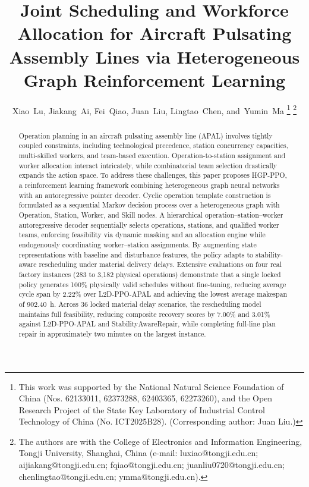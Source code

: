 \documentclass[journal,10pt]{IEEEtran}
\begin{document}
\title{Joint Scheduling and Workforce Allocation for Aircraft Pulsating Assembly Lines via Heterogeneous Graph Reinforcement Learning}

\author{Xiao~Lu,
        Jiakang~Ai,
        Fei~Qiao,
        Juan~Liu,
        Lingtao~Chen,
        and~Yumin~Ma%
\thanks{This work was supported by the National Natural Science Foundation of China (Nos. 62133011, 62373288, 62403365, 62273260), and the Open Research Project of the State Key Laboratory of Industrial Control Technology of China (No. ICT2025B28). (Corresponding author: Juan Liu.)}%
\thanks{The authors are with the College of Electronics and Information Engineering, Tongji University, Shanghai, China (e-mail: luxiao@tongji.edu.cn; aijiakang@tongji.edu.cn; fqiao@tongji.edu.cn; juanliu0720@tongji.edu.cn; chenlingtao@tongji.edu.cn; ymma@tongji.edu.cn).}%
}


\maketitle

\begin{abstract}
Operation planning in an aircraft pulsating assembly line (APAL) involves tightly coupled constraints, including technological precedence, station concurrency capacities, multi-skilled workers, and team-based execution. Operation-to-station assignment and worker allocation interact intricately, while combinatorial team selection drastically expands the action space. To address these challenges, this paper proposes HGP-PPO, a reinforcement learning framework combining heterogeneous graph neural networks with an autoregressive pointer decoder. Cyclic operation template construction is formulated as a sequential Markov decision process over a heterogeneous graph with Operation, Station, Worker, and Skill nodes. A hierarchical operation--station--worker autoregressive decoder sequentially selects operations, stations, and qualified worker teams, enforcing feasibility via dynamic masking and an allocation engine while endogenously coordinating worker--station assignments. By augmenting state representations with baseline and disturbance features, the policy adapts to stability-aware rescheduling under material delivery delays. Extensive evaluations on four real factory instances (283 to 3,182 physical operations) demonstrate that a single locked policy generates 100\% physically valid schedules without fine-tuning, reducing average cycle span by 2.22\% over L2D-PPO-APAL and achieving the lowest average makespan of 902.40~h. Across 36 locked material delay scenarios, the rescheduling model maintains full feasibility, reducing composite recovery scores by 7.00\% and 3.01\% against L2D-PPO-APAL and StabilityAwareRepair, while completing full-line plan repair in approximately two minutes on the largest instance.
\end{abstract}
\end{document}
